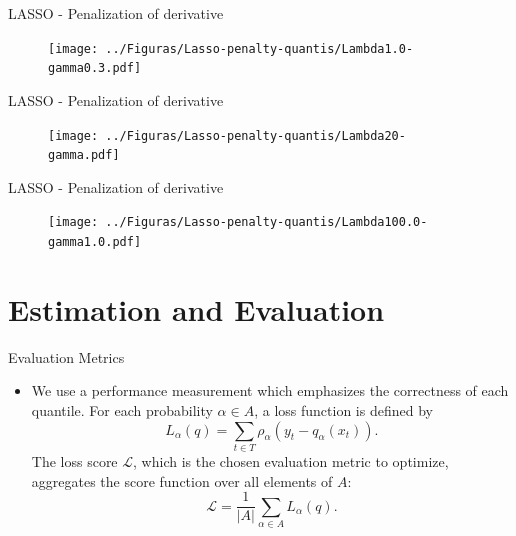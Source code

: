 \begin{frame}{LASSO - Penalization of derivative}

\begin{figure}
\centering
\texttt{[image: ../Figuras/Lasso-penalty-quantis/Lambda1.0-gamma0.3.pdf]}
\caption{}
\end{figure}

\end{frame}

\begin{frame}{LASSO - Penalization of derivative}

\begin{figure}
\centering
\texttt{[image: ../Figuras/Lasso-penalty-quantis/Lambda20-gamma.pdf]}
\caption{}
\end{figure}

\end{frame}

\begin{frame}{LASSO - Penalization of derivative}

\begin{figure}
\centering
\texttt{[image: ../Figuras/Lasso-penalty-quantis/Lambda100.0-gamma1.0.pdf]}
\caption{}
\end{figure}

\end{frame}

\section{Estimation and Evaluation}\label{estimation-and-evaluation}

\begin{frame}{Evaluation Metrics}

\begin{itemize}
\tightlist
\item
  We use a performance measurement which emphasizes the correctness of
  each quantile. For each probability \(\alpha \in A\), a loss function
  is defined by
  \[L_\alpha(q)= \sum_{t\in T}\rho_{\alpha}(y_{t}-q_{\alpha}(x_t)).\]
  The loss score \(\mathcal{L}\), which is the chosen evaluation metric
  to optimize, aggregates the score function over all elements of \(A\):
  \[\mathcal{L}= \frac{1}{|A|}\sum_{\alpha \in A}L_\alpha(q).\]
\end{itemize}

\end{frame}

